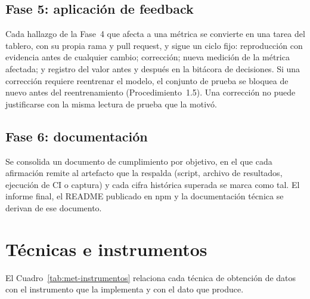 \subsection{Fase 5: aplicación de feedback}
\label{subsec:met-f5}
Cada hallazgo de la Fase~4 que afecta a una métrica se convierte en una tarea del tablero, con
su propia rama y pull request, y sigue un ciclo fijo: reproducción con evidencia antes de
cualquier cambio; corrección; nueva medición de la métrica afectada; y registro del valor antes
y después en la bitácora de decisiones. Si una corrección requiere reentrenar el modelo, el
conjunto de prueba se bloquea de nuevo antes del reentrenamiento (Procedimiento~1.5). Una
corrección no puede justificarse con la misma lectura de prueba que la motivó.

\subsection{Fase 6: documentación}
\label{subsec:met-f6}
Se consolida un documento de cumplimiento por objetivo, en el que cada afirmación remite al
artefacto que la respalda (script, archivo de resultados, ejecución de CI o captura) y cada
cifra histórica superada se marca como tal. El informe final, el README publicado en npm y la
documentación técnica se derivan de ese documento.

\section{Técnicas e instrumentos}
\label{sec:met-instrumentos}

El Cuadro~\ref{tab:met-instrumentos} relaciona cada técnica de obtención de datos con el
instrumento que la implementa y con el dato que produce.

